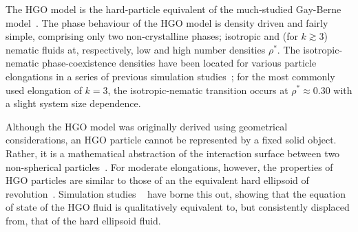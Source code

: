 \documentclass[aps,10pt,twocolumn]{revtex4}
\begin{document}
The HGO model is the hard-particle equivalent of the much-studied Gay-Berne model~\cite{GayBerne81}. The phase
behaviour of the HGO model is density driven and fairly simple, comprising only two non-crystalline phases;
isotropic and (for $k\gtrsim 3$) nematic fluids at, respectively, low and high number densities $\rho^{*}$. The
isotropic-nematic phase-coexistence densities have been located for various particle elongations in a series of
previous simulation studies~\cite{PadillaVelasco97,DeMiguelDelRio01,DeMiguelDelRio03}; for the most commonly used
elongation of $k=3$, the isotropic-nematic transition occurs at $\rho^{*}\approx 0.30$ with a slight system size
dependence.

Although the HGO model was originally derived using geometrical considerations, an HGO particle cannot be
represented by a fixed solid object. Rather, it is a mathematical abstraction of the interaction surface between
two non-spherical particles~\cite{Rigby89}. For moderate elongations, however, the properties of HGO particles are
similar to those of an the equivalent hard ellipsoid of revolution~\cite{Rigby89}. Simulation studies
~\cite{DeMiguelDelRio03} have borne this out, showing that the equation of state of the HGO fluid is qualitatively
equivalent to, but consistently displaced from, that of the hard ellipsoid fluid.
\end{document}
